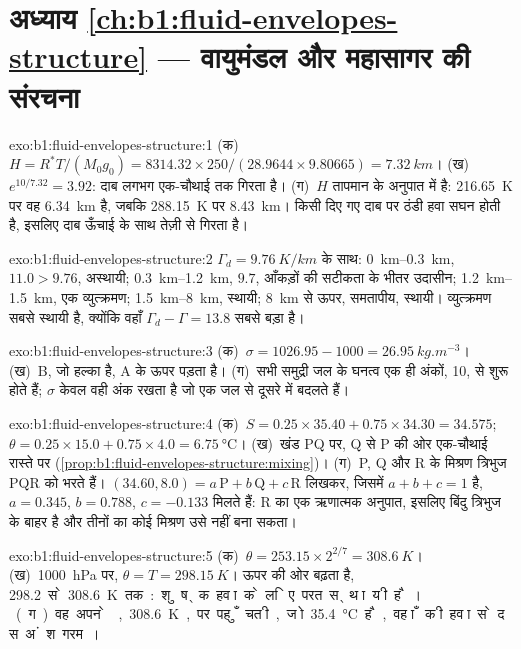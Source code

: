 \section*{अध्याय \ref{ch:b1:fluid-envelopes-structure} --- वायुमंडल और महासागर की संरचना}

\begin{solution}{exo:b1:fluid-envelopes-structure:1}
(क)~$H = R^*T/(M_0 g_0) = 8314.32 \times 250/(28.9644 \times 9.80665) =
\qty{7.32}{km}$। (ख)~$e^{10/7.32} = 3.92$: दाब लगभग एक-चौथाई तक गिरता है। (ग)~$H$ तापमान के अनुपात में है: \qty{216.65}{K} पर वह \qty{6.34}{km} है, जबकि \qty{288.15}{K} पर \qty{8.43}{km}। किसी दिए गए दाब पर ठंडी हवा सघन होती है, इसलिए दाब ऊँचाई के साथ तेज़ी से गिरता है।
\end{solution}

\begin{solution}{exo:b1:fluid-envelopes-structure:2}
$\Gamma_d = \qty{9.76}{K/km}$ के साथ: \qtyrange{0}{0.3}{km}, $11.0 > 9.76$, अस्थायी; \qtyrange{0.3}{1.2}{km}, $9.7$, आँकड़ों की सटीकता के भीतर उदासीन; \qtyrange{1.2}{1.5}{km}, एक व्युत्क्रमण; \qtyrange{1.5}{8}{km}, स्थायी; \qty{8}{km} से ऊपर, समतापीय, स्थायी। व्युत्क्रमण सबसे स्थायी है, क्योंकि वहाँ $\Gamma_d - \Gamma = 13.8$ सबसे बड़ा है।
\end{solution}

\begin{solution}{exo:b1:fluid-envelopes-structure:3}
(क)~$\sigma = 1026.95 - 1000 = \qty{26.95}{kg.m^{-3}}$। (ख)~B, जो हल्का है, A के ऊपर पड़ता है। (ग)~सभी समुद्री जल के घनत्व एक ही अंकों, 10, से शुरू होते हैं; $\sigma$ केवल वही अंक रखता है जो एक जल से दूसरे में बदलते हैं।
\end{solution}

\begin{solution}{exo:b1:fluid-envelopes-structure:4}
(क)~$S = 0.25 \times 35.40 + 0.75 \times 34.30 = 34.575$; $\theta = 0.25 \times
15.0 + 0.75 \times 4.0 = \qty{6.75}{\celsius}$। (ख)~खंड PQ पर, Q से P की ओर एक-चौथाई रास्ते पर (\cref{prop:b1:fluid-envelopes-structure:mixing})। (ग)~P, Q और R के मिश्रण त्रिभुज PQR को भरते हैं। $(34.60, 8.0) = a\,\mathrm P + b\,\mathrm Q + c\,\mathrm R$ लिखकर, जिसमें $a + b + c = 1$ है, $a = 0.345$, $b = 0.788$, $c = -0.133$ मिलते हैं: R का एक ऋणात्मक अनुपात, इसलिए बिंदु त्रिभुज के बाहर है और तीनों का कोई मिश्रण उसे नहीं बना सकता।
\end{solution}

\begin{solution}{exo:b1:fluid-envelopes-structure:5}
(क)~$\theta = 253.15 \times 2^{2/7} = \qty{308.6}{K}$। (ख)~\qty{1000}{hPa} पर, $\theta = T = \qty{298.15}{K}$।  ऊपर की ओर बढ़ता है, \qty{298.2} से \qty{308.6}{K} तक: शुष्क हवा के लिए परत स्थायी है। (ग)~वह अपने , \qty{308.6}{K}, पर पहुँचती, जो \qty{35.4}{\celsius} है, वहाँ की हवा से दस अंश गरम।
\end{solution}

